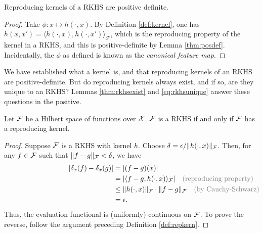 \begin{corollary}
  Reproducing kernels of a RKHS are positive definite. 
\end{corollary}

\begin{proof}
  Take $\phi: x \mapsto h(\cdot,x)$. 
  By Definition \ref{def:kernel}, one has $h(x,x') = \langle h(\cdot, x), h(\cdot, x') \rangle_{\mathcal F}$, which is the reproducing property of the kernel in a RKHS, and this is positive-definite by Lemma \ref{thm:posdef}. 
  Incidentally, the $\phi$ as defined is known as the \emph{canonical feature map}.
\end{proof}

We have established what a kernel is, and that reproducing kernels of an RKHS are positive-definite. 
But do reproducing kernels always exist, and if so, are they unique to an RKHS?
Lemmas \ref{thm:rkhsexist} and \ref{eq:rkhsunique} answer these questions in the positive.

\begin{lemma}\label{thm:rkhsexist}
  Let ${\mathcal F}$ be a Hilbert space of functions over ${\mathcal X}$.
  ${\mathcal F}$ is a RKHS if and only if ${\mathcal F}$ has a reproducing kernel.  
\end{lemma}

\begin{proof}
  Suppose ${\mathcal F}$ is a RKHS with kernel $h$.
  Choose $\delta=\epsilon / \lVert h(\cdot,x)\rVert_{\mathcal F}$.
  Then, for any $f \in {\mathcal F}$ such that $\lVert f-g\rVert_{\mathcal F} < \delta$, we have
  \begin{align*}
    \vert \delta_x (f) - \delta_x (g) \vert 
    &= \vert (f-g)(x) \vert \\
    &= |\ip{f-g,h(\cdot,x)}_\cF| \hspace{1em} \rlap{\color{gray} (reproducing property)} \\
    &\leq \norm{h(\cdot,x)}_\cF \cdot \norm{f-g}_\cF \hspace{1em} \rlap{\color{gray} (by Cauchy-Schwarz)} \\
    &= \epsilon.
  \end{align*}
  Thus, the evaluation functional is (uniformly) continuous on ${\mathcal F}$.
  To prove the reverse, follow the argument preceding Definition \ref{def:repkern}.
\end{proof}

